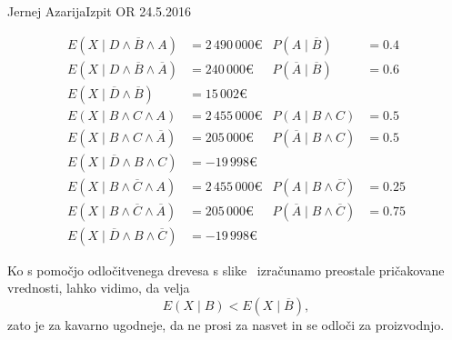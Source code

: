 \begin{naloga}{Jernej Azarija}{Izpit OR 24.5.2016}
\begin{odgovor}
\begin{align*}
E(X \mid D \land \overline{B} \land A) &= 2\,490\,000 € &
P(A \mid \overline{B}) &= 0.4 \\
E(X \mid D \land \overline{B} \land \overline{A}) &= 240\,000 € &
P(\overline{A} \mid \overline{B})& = 0.6 \\
E(X \mid \overline{D} \land \overline{B}) &= 15\,002 € \\[1ex]
E(X \mid B \land C \land A) &=2\,455\,000 € &
P(A \mid B \land C) &= 0.5 \\
E(X \mid B \land C \land \overline{A}) &=205\,000 € &
P(\overline{A} \mid B \land C) &= 0.5 \\
E(X \mid \overline{D} \land B \land C) &= -19\,998 € \\[1ex]
E(X \mid B \land \overline{C} \land A) &=2\,455\,000 € &
P(A \mid B \land \overline{C}) &= 0.25 \\
E(X \mid B \land \overline{C} \land \overline{A}) &=205\,000 € &
P(\overline{A} \mid B \land \overline{C}) &= 0.75 \\
E(X \mid \overline{D} \land B \land \overline{C}) &= -19\,998 €
\end{align*}


Ko s pomočjo odločitvenega drevesa s slike~\fig
izračunamo preostale pričakovane vrednosti,
lahko vidimo, da velja
$$
E(X \mid B) < E(X \mid \overline{B}) ,
$$
zato je za kavarno ugodneje,
da ne prosi za nasvet in se odloči za proizvodnjo.

\begin{slika}
\makebox[\textwidth][c]{
\pgfslika
}
\end{slika}
\end{odgovor}
\end{naloga}
